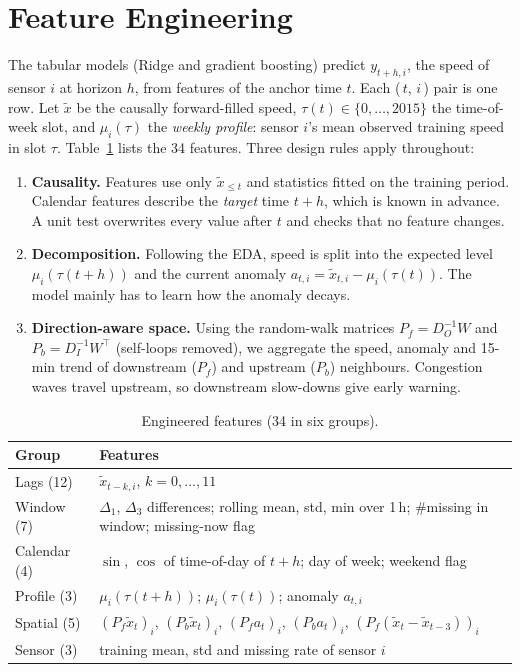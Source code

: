 \section{Feature Engineering}
\label{sec:features}
The tabular models (Ridge and gradient boosting) predict $y_{t+h,i}$, the speed of
sensor $i$ at horizon $h$, from features of the anchor time $t$. Each
(\,$t$, $i$\,) pair is one row. Let $\tilde{x}$ be the causally forward-filled speed,
$\tau(t)\in\{0,\dots,2015\}$ the time-of-week slot, and
$\mu_i(\tau)$ the \emph{weekly profile}: sensor $i$'s mean observed training speed in
slot $\tau$. Table~\ref{tab:features} lists the 34 features. Three design rules
apply throughout:
\begin{enumerate}
\item \textbf{Causality.} Features use only $\tilde{x}_{\le t}$ and statistics fitted
on the training period. Calendar features describe the \emph{target} time
$t{+}h$, which is known in advance. A unit test overwrites every value after $t$ and
checks that no feature changes.
\item \textbf{Decomposition.} Following the EDA, speed is split into the expected
level $\mu_i(\tau(t{+}h))$ and the current anomaly $a_{t,i}=\tilde{x}_{t,i}-\mu_i(\tau(t))$.
The model mainly has to learn how the anomaly decays.
\item \textbf{Direction-aware space.} Using the random-walk matrices
$P_f=D_O^{-1}W$ and $P_b=D_I^{-1}W^{\top}$ (self-loops removed), we aggregate the
speed, anomaly and 15-min trend of downstream ($P_f$) and upstream ($P_b$)
neighbours. Congestion waves travel upstream, so downstream slow-downs give early
warning.
\end{enumerate}

\begin{table}[t]
\centering
\caption{Engineered features (34 in six groups).}
\label{tab:features}
\setlength{\tabcolsep}{3pt}
\begin{tabular}{p{1.6cm}p{6.4cm}}
\toprule
Group & Features \\
\midrule
Lags (12) & $\tilde{x}_{t-k,i}$, $k=0,\dots,11$ \\
Window (7) & $\Delta_1$, $\Delta_3$ differences; rolling mean, std, min over 1\,h; \#missing in window; missing-now flag \\
Calendar (4) & $\sin$, $\cos$ of time-of-day of $t{+}h$; day of week; weekend flag \\
Profile (3) & $\mu_i(\tau(t{+}h))$; $\mu_i(\tau(t))$; anomaly $a_{t,i}$ \\
Spatial (5) & $(P_f\tilde{x}_t)_i$, $(P_b\tilde{x}_t)_i$, $(P_f a_t)_i$, $(P_b a_t)_i$, $(P_f(\tilde{x}_t-\tilde{x}_{t-3}))_i$ \\
Sensor (3) & training mean, std and missing rate of sensor $i$ \\
\bottomrule
\end{tabular}
\end{table}

